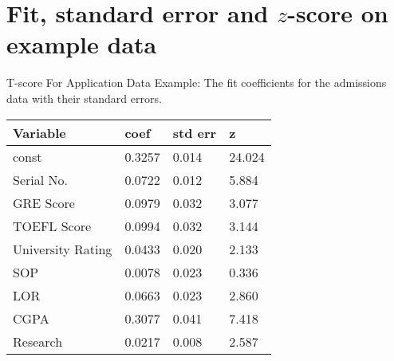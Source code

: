 \documentclass[10pt, table, dvipsnames,xcdraw, handout ]{beamer}
\begin{document}
\section{Fit, standard error and $z$-score on example data}






\begin{frame}[fragile]{T-score For Application Data}
Example: The fit coefficients for the admissions data with their standard errors. 
\begin{table}[]
\begin{tabular}{llll}
\hline
\textbf{Variable} & \textbf{coef} & \multicolumn{1}{c}{\textbf{std err}} & \textbf{z} \\ \hline
const             & 0.3257        & 0.014                                & 24.024     \\
Serial No.        & 0.0722        & 0.012                                & 5.884      \\
GRE Score         & 0.0979        & 0.032                                & 3.077      \\
TOEFL Score       & 0.0994        & 0.032                                & 3.144      \\
University Rating & 0.0433        & 0.020                                & 2.133      \\
SOP               & 0.0078        & 0.023                                & 0.336      \\
LOR               & 0.0663        & 0.023                                & 2.860      \\
CGPA              & 0.3077        & 0.041                                & 7.418      \\
Research          & 0.0217        & 0.008                                & 2.587     
\end{tabular}
\end{table}
\end{frame}
\end{document}
